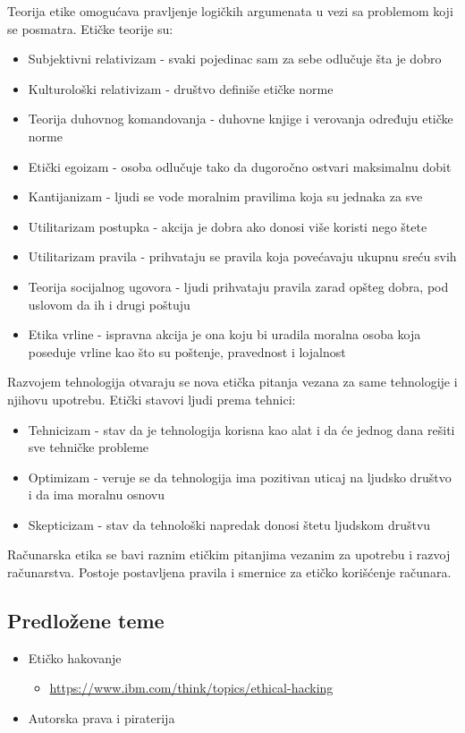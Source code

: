 \documentclass[a4paper,12pt]{article}
\begin{document}
Teorija etike omogućava pravljenje logičkih argumenata u vezi sa problemom koji se posmatra.  Etičke teorije su:
\begin{itemize}
    \item Subjektivni relativizam - svaki pojedinac sam za sebe odlučuje šta je dobro
    \item Kulturološki relativizam - društvo definiše etičke norme
    \item Teorija duhovnog komandovanja - duhovne knjige i verovanja određuju etičke norme
    \item Etički egoizam - osoba odlučuje tako da dugoročno ostvari maksimalnu dobit
    \item Kantijanizam - ljudi se vode moralnim pravilima koja su jednaka za sve
    \item Utilitarizam postupka - akcija je dobra ako donosi više koristi nego štete
    \item Utilitarizam pravila - prihvataju se pravila koja povećavaju ukupnu sreću svih
    \item Teorija socijalnog ugovora - ljudi prihvataju pravila zarad opšteg dobra, pod uslovom da ih i drugi poštuju
    \item Etika vrline - ispravna akcija je ona koju bi uradila moralna osoba koja poseduje vrline kao što su poštenje, pravednost i lojalnost
\end{itemize}

Razvojem tehnologija otvaraju se nova etička pitanja vezana za same tehnologije i njihovu upotrebu. Etički stavovi ljudi prema tehnici: 
\begin{itemize}
    \item Tehnicizam - stav da je tehnologija korisna kao alat i da će jednog dana rešiti sve tehničke probleme
    \item Optimizam - veruje se da tehnologija ima pozitivan uticaj na ljudsko društvo i da ima moralnu osnovu
    \item Skepticizam - stav da tehnološki napredak donosi štetu ljudskom društvu 
\end{itemize}

Računarska etika se bavi raznim etičkim pitanjima vezanim za upotrebu i razvoj računarstva. Postoje postavljena pravila i smernice za etičko korišćenje računara.

\subsection{Predložene teme}
\begin{itemize}
    \item Etičko hakovanje 
    \begin{itemize}
        \item \small{\href{https://www.ibm.com/think/topics/ethical-hacking}{https://www.ibm.com/think/topics/ethical-hacking}}
    \end{itemize}
    \item Autorska prava i piraterija
\end{itemize}
\end{document}
